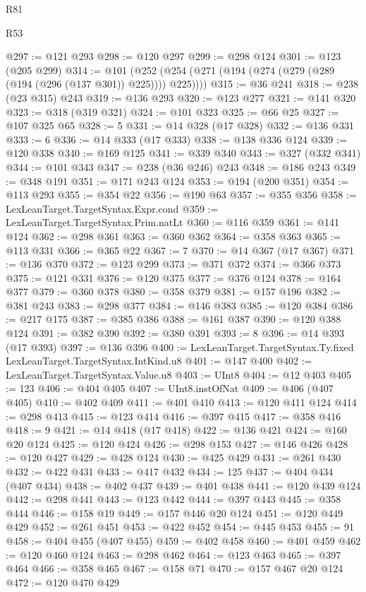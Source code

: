 \begin{lexlean}{R81}
\begin{lexlean}{R53}
\begin{coremodule}
{{{{{{{{{{{{{{{{{{{{{{{{{{{{{{{{{{{{{{{{{{{{{{{{{{{{{{{{{{{{{{{{{{{{{{{{{{{{{{{{{{{{{{{{{{{{{{{{{{{{{{{{{{{{{{{{@297 := @121 @293
@298 := @120 @297
@299 := @298 @124
@301 := @123 (@205 @299)
@314 := @101 (@252 (@254 (@271 (@194 (@274 (@279 (@289 (@194 (@296 (@137 @301)) @225)))) @225))))
@315 := @36 @241
@318 := @238 (@23 @315) @243
@319 := @136 @293
@320 := @123 @277
@321 := @141 @320
@323 := @318 (@319 @321)
@324 := @101 @323
@325 := @66 @25
@327 := @107 @325 @65
@328 := 5
@331 := @14 @328 (@17 @328)
@332 := @136 @331
@333 := 6
@336 := @14 @333 (@17 @333)
@338 := @138 @336 @124
@339 := @120 @338
@340 := @169 @125
@341 := @339 @340
@343 := @327 (@332 @341)
@344 := @101 @343
@347 := @238 (@36 @246) @243
@348 := @186 @243
@349 := @348 @191
@351 := @171 @243 @124
@353 := @194 (@200 @351)
@354 := @113 @293
@355 := @354 @22
@356 := @190 @63
@357 := @355 @356
@358 := LexLeanTarget.TargetSyntax.Expr.cond
@359 := LexLeanTarget.TargetSyntax.Prim.natLt
@360 := @116 @359
@361 := @141 @124
@362 := @298 @361
@363 := @360 @362
@364 := @358 @363
@365 := @113 @331
@366 := @365 @22
@367 := 7
@370 := @14 @367 (@17 @367)
@371 := @136 @370
@372 := @123 @299
@373 := @371 @372
@374 := @366 @373
@375 := @121 @331
@376 := @120 @375
@377 := @376 @124
@378 := @164 @377
@379 := @360 @378
@380 := @358 @379
@381 := @157 @196
@382 := @381 @243
@383 := @298 @377
@384 := @146 @383
@385 := @120 @384
@386 := @217 @175
@387 := @385 @386
@388 := @161 @387
@390 := @120 @388 @124
@391 := @382 @390
@392 := @380 @391
@393 := 8
@396 := @14 @393 (@17 @393)
@397 := @136 @396
@400 := LexLeanTarget.TargetSyntax.Ty.fixed LexLeanTarget.TargetSyntax.IntKind.u8
@401 := @147 @400
@402 := LexLeanTarget.TargetSyntax.Value.u8
@403 := UInt8
@404 := @12 @403
@405 := 123
@406 := @404 @405
@407 := UInt8.instOfNat
@409 := @406 (@407 @405)
@410 := @402 @409
@411 := @401 @410
@413 := @120 @411 @124
@414 := @298 @413
@415 := @123 @414
@416 := @397 @415
@417 := @358 @416
@418 := 9
@421 := @14 @418 (@17 @418)
@422 := @136 @421
@424 := @160 @20 @124
@425 := @120 @424
@426 := @298 @153
@427 := @146 @426
@428 := @120 @427
@429 := @428 @124
@430 := @425 @429
@431 := @261 @430
@432 := @422 @431
@433 := @417 @432
@434 := 125
@437 := @404 @434 (@407 @434)
@438 := @402 @437
@439 := @401 @438
@441 := @120 @439 @124
@442 := @298 @441
@443 := @123 @442
@444 := @397 @443
@445 := @358 @444
@446 := @158 @19
@449 := @157 @446 @20 @124
@451 := @120 @449 @429
@452 := @261 @451
@453 := @422 @452
@454 := @445 @453
@455 := 91
@458 := @404 @455 (@407 @455)
@459 := @402 @458
@460 := @401 @459
@462 := @120 @460 @124
@463 := @298 @462
@464 := @123 @463
@465 := @397 @464
@466 := @358 @465
@467 := @158 @71
@470 := @157 @467 @20 @124
@472 := @120 @470 @429
}}}}}}}}}}}}}}}}}}}}}}}}}}}}}}}}}}}}}}}}}}}}}}}}}}}}}}}}}}}}}}}}}}}}}}}}}}}}}}}}}}}}}}}}}}}}}}}}}}}}}}}}}}}}}}}}
\end{coremodule}
\end{lexlean}
\end{lexlean}
